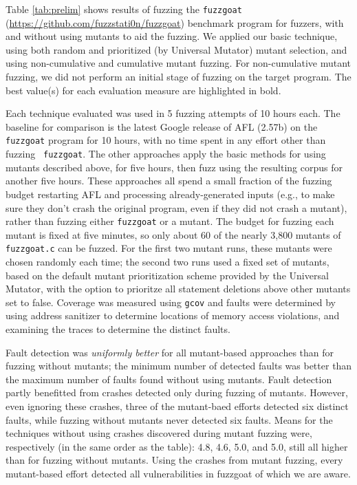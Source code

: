 Table \ref{tab:prelim} shows results of fuzzing the {\tt fuzzgoat}
(\url{https://github.com/fuzzstati0n/fuzzgoat}) benchmark program for
fuzzers, with and without using mutants to aid the fuzzing.  We
applied our basic technique, using both random and prioritized (by
Universal Mutator) mutant selection, and using non-cumulative and
cumulative mutant fuzzing.  For non-cumulative mutant fuzzing, we did
not perform an initial stage of fuzzing on the target program. The
best value(s) for each evaluation measure are highlighted in bold.


Each
technique evaluated was used in 5 fuzzing attempts of 10 hours each.  The
baseline for comparison is the latest Google release of  AFL (2.57b) on the {\tt fuzzgoat} program for 10
hours, with no time spent in any effort other than fuzzing {\tt
  fuzzgoat}.  The other approaches apply the basic methods for using
mutants described above, for five hours, then fuzz using the resulting
corpus for another five hours.  These approaches all spend a small
fraction of the fuzzing budget restarting AFL and processing
already-generated inputs (e.g., to make sure they don't crash the
original program, even if they did not crash a mutant), rather than
fuzzing either {\tt fuzzgoat} or a mutant.  The budget for fuzzing
each mutant is fixed at five minutes, so only about 60 of the nearly
3,800 mutants of {\tt fuzzgoat.c} can be fuzzed.  For the first two
mutant runs, these mutants were chosen randomly each time; the second
two runs used a fixed set of mutants, based on the default mutant
prioritization scheme provided by the Universal Mutator, with the option to prioritze all statement deletions above other mutants set to false.  Coverage was measured using {\tt gcov} and faults were determined by using address sanitizer to determine locations of memory access violations, and examining the traces to determine the distinct faults.

Fault
detection was \emph{uniformly better} for all mutant-based approaches than
for fuzzing without mutants; the minimum number of detected faults was
better than the maximum number of faults found without using mutants.  Fault detection partly benefitted from crashes detected only during fuzzing of mutants.  However, even ignoring these crashes, three of the mutant-baed efforts detected six distinct faults, while fuzzing without mutants never detected six faults.  Means for the techniques without using crashes discovered during mutant fuzzing were, respectively (in the same order as the table): 4.8, 4.6, 5.0, and 5.0, still all higher than for fuzzing without mutants.  Using the crashes from mutant fuzzing, every mutant-based effort detected all vulnerabilities in fuzzgoat of which we are aware.


